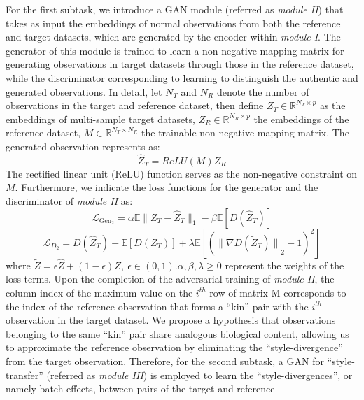\documentclass{article}
\begin{document}
For the first subtask, we introduce a GAN module (referred as \textit{module II}) that takes 
as input the embeddings of normal observations from both the reference and target datasets, 
which are generated by the encoder within \textit{module I}. The generator of this module is 
trained to learn a non-negative mapping matrix for generating observations in target 
datasets through those in the reference dataset, while the discriminator corresponding to 
learning to distinguish the authentic and generated observations. In detail, let $N_T$ 
and $N_R$ denote the number of observations in the target and reference dataset, then 
define $Z_T\in\mathbb{R}^{N_T\times p}$ as the embeddings of multi-sample target datasets, 
$Z_R\in\mathbb{R}^{N_R\times p}$ the embeddings of the reference dataset, 
$M\in\mathbb{R}^{N_T\times N_R}$ the trainable non-negative mapping matrix. The generated 
observation represents as: 
\begin{equation}
    {\widehat{Z}}_T=ReLU(M)Z_R 
\end{equation}
The rectified linear unit (ReLU) function serves as the non-negative constraint on $M$. 
Furthermore, we indicate the loss functions for the generator and the discriminator of 
\textit{module II} as:
\begin{equation}
    \mathcal{L}_{\text{Gen}_2} = \alpha\mathbb{E}\|Z_T - \widehat{Z}_T\|_1 - \beta\mathbb{E}[D(\widehat{Z}_T)] 
\end{equation}
\begin{equation}
        \mathcal{L}_{D_2} = D(\widehat{Z}_T) - \mathbb{E}\left[D(Z_T)\right] + \lambda\mathbb{E}\left[({\|\nabla D(\widetilde{Z}_T)\|}_2 - 1)^2\right]
\end{equation}
where  $\widetilde{Z}=\epsilon\widehat{Z}+\left(1-\epsilon\right)Z,\ 
\epsilon\in\left(0,1\right)$.$\alpha,\beta,\lambda\geq0$ represent the weights of the loss 
terms. Upon the completion of the adversarial training of \textit{module II}, the column index of 
the maximum value on the $i^{th}$ row of matrix M corresponds to the index of the reference 
observation that forms a “kin” pair with the $i^{th}$ observation in the target dataset. 
We propose a hypothesis that observations belonging to the same “kin” pair share analogous 
biological content, allowing us to approximate the reference observation by eliminating 
the “style-divergence” from the target observation. Therefore, for the second subtask, a 
GAN for “style-transfer” (referred as \textit{module III}) is employed to learn the 
“style-divergences”, or namely batch effects, between pairs of the target and reference 
\end{document}

